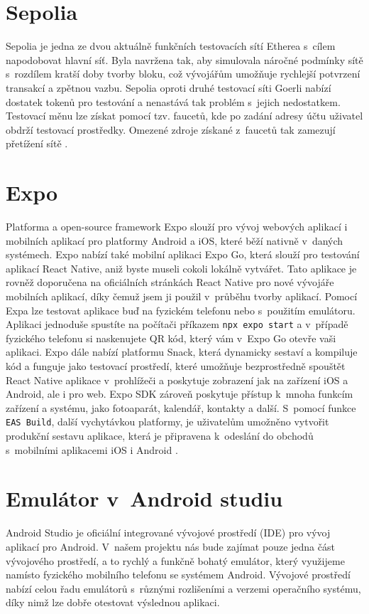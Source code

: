 \section{Sepolia}
\label{sepolia}
Sepolia je jedna ze dvou aktuálně funkčních testovacích sítí Etherea s~cílem napodobovat hlavní síť. Byla navržena tak, aby simulovala náročné podmínky sítě s~rozdílem kratší doby tvorby bloku, což vývojářům umožňuje rychlejší potvrzení transakcí a zpětnou vazbu. Sepolia oproti druhé testovací síti Goerli nabízí dostatek tokenů pro testování a nenastává tak problém s~jejich nedostatkem. Testovací měnu lze získat pomocí tzv. faucetů, kde po zadání adresy účtu uživatel obdrží testovací prostředky. Omezené zdroje získané z~faucetů tak zamezují přetížení sítě \cite{sepolia}.

\section{Expo}
Platforma a open-source framework Expo slouží pro vývoj webových aplikací i mobilních aplikací pro platformy Android a iOS, které běží nativně v~daných systémech. Expo nabízí také mobilní aplikaci Expo Go, která slouží pro testování aplikací React Native, aniž byste museli cokoli lokálně vytvářet. Tato aplikace je rovněž doporučena na oficiálních stránkách React Native pro nové vývojáře mobilních aplikací, díky čemuž jsem ji použil v~průběhu tvorby aplikací. Pomocí Expa lze testovat aplikace buď na fyzickém telefonu nebo s~použitím emulátoru. Aplikaci jednoduše spustíte na počítači příkazem \texttt{npx expo start} a v~případě fyzického telefonu si naskenujete QR kód, který vám v~Expo Go otevře vaši aplikaci. Expo dále nabízí platformu Snack, která dynamicky sestaví a kompiluje kód a funguje jako testovací prostředí, které umožňuje bezprostředně spouštět React Native aplikace v~prohlížeči a poskytuje zobrazení jak na zařízení iOS a Android, ale i pro web. Expo SDK zároveň poskytuje přístup k~mnoha funkcím zařízení a systému, jako fotoaparát, kalendář, kontakty a další. S~pomocí funkce \texttt{EAS Build}, další vychytávkou platformy, je uživatelům umožněno vytvořit produkční sestavu aplikace, která je připravena k~odeslání do obchodů s~mobilními aplikacemi iOS i Android \cite{expo}. 
\section{Emulátor v~Android studiu}
Android Studio je oficiální integrované vývojové prostředí (IDE) pro vývoj aplikací pro Android. V~našem projektu nás bude zajímat pouze jedna část vývojového prostředí, a to rychlý a funkčně bohatý emulátor, který využijeme namísto fyzického mobilního telefonu se systémem Android. Vývojové prostředí nabízí celou řadu emulátorů s~různými rozlišeními a verzemi operačního systému, díky nimž lze dobře otestovat výslednou aplikaci. 
